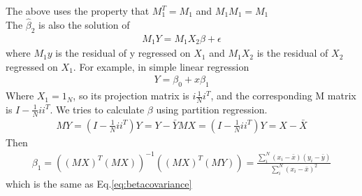 \documentclass[a4paper]{article}
\begin{document}
The above uses the property that $M_1^T=M_1$ and $M_1 M_1 = M_1$\\
The $\hat \beta_2$ is also the solution of 
\begin{align*}
 M_1 Y = M_1 X_2 \beta + \epsilon
\end{align*}
where $M_1 y$ is the residual of y regressed on $X_1$ and $M_1 X_2$ is the residual of $X_2$ regressed on $X_1$.
For example, in simple linear regression
\begin{align*}
Y= \beta_0 + x\beta_1
\end{align*}
Where $X_1=1_N$, so its projection matrix is $i\frac{1}{N}i^T$, and the corresponding M matrix is $I - \frac{1}{N}ii^T$.
We tries to calculate $\beta$ using partition regression. 
\begin{align*}
MY = (I-\frac{1}{N}ii^T)Y = Y-\bar Y
MX = (I-\frac{1}{N}ii^T)Y = X-\bar X
\end{align*}
Then
\begin{align}
\beta_1 = ((MX)^T(MX))^{-1}((MX)^T(MY))  = \frac{\sum_i^N(x_i - \bar x)(y_i - \bar y)}{\sum_i^N(x_i-\bar x)^2} \label{eq:betapartition}
\end{align}
which is the same as Eq.\ref{eq:betacovariance}
\end{document}
